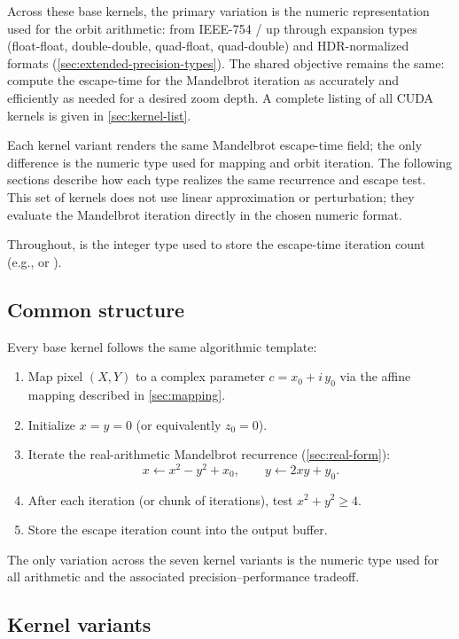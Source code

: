 Across these base kernels, the primary variation is the numeric representation
used for the orbit arithmetic: from IEEE-754 / up
through expansion types (float-float, double-double, quad-float, quad-double)
and HDR-normalized formats (\cref{sec:extended-precision-types}). The shared objective remains the same: compute the
escape-time for the Mandelbrot iteration as accurately and efficiently as needed
for a desired zoom depth.  A complete listing of all CUDA kernels is given in
\cref{sec:kernel-list}.

Each kernel variant renders the same Mandelbrot escape-time field; the only
difference is the numeric type used for mapping and orbit iteration. The
following sections describe how each type realizes the same recurrence and
escape test.  This set of kernels does not use linear approximation or
perturbation; they evaluate the Mandelbrot iteration directly in the
chosen numeric format.

Throughout,  is the integer type used to store the escape-time
iteration count (e.g.,  or ).

\subsection{Common structure}

Every base kernel follows the same algorithmic template:
\begin{enumerate}
  \item Map pixel \((X,Y)\) to a complex parameter \(c = x_0 + i\,y_0\)
        via the affine mapping described in \cref{sec:mapping}.
  \item Initialize \(x = y = 0\) (or equivalently \(z_0 = 0\)).
  \item Iterate the real-arithmetic Mandelbrot recurrence (\cref{sec:real-form}):
        \[
          x \leftarrow x^2 - y^2 + x_0,\qquad y \leftarrow 2xy + y_0.
        \]
  \item After each iteration (or chunk of iterations), test \(x^2 + y^2 \ge 4\).
  \item Store the escape iteration count into the output buffer.
\end{enumerate}
The only variation across the seven kernel variants is the numeric type used for
all arithmetic and the associated precision--performance tradeoff.

\subsection{Kernel variants}

